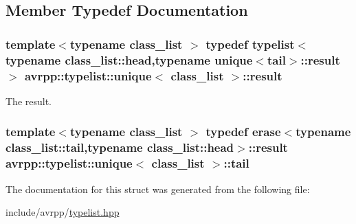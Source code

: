 \subsection{Member Typedef Documentation}
\hypertarget{structavrpp_1_1typelist_1_1unique_a97c55b4f6702dc3b0997cf84b767fcb5}{
\subsubsection[{result}]{\setlength{\rightskip}{0pt plus 5cm}template$<$typename class\_\-list $>$ typedef {\bf typelist}$<$typename class\_\-list::head,typename {\bf unique}$<${\bf tail}$>$::{\bf result}$>$ {\bf avrpp::typelist::unique}$<$ class\_\-list $>$::{\bf result}}}
\label{structavrpp_1_1typelist_1_1unique_a97c55b4f6702dc3b0997cf84b767fcb5}


The result. 

\hypertarget{structavrpp_1_1typelist_1_1unique_a4868ed50111f93853eed0321df7395ec}{
\subsubsection[{tail}]{\setlength{\rightskip}{0pt plus 5cm}template$<$typename class\_\-list $>$ typedef {\bf erase}$<$typename class\_\-list::tail,typename class\_\-list::head$>$::{\bf result} {\bf avrpp::typelist::unique}$<$ class\_\-list $>$::{\bf tail}}}
\label{structavrpp_1_1typelist_1_1unique_a4868ed50111f93853eed0321df7395ec}


The documentation for this struct was generated from the following file:\begin{DoxyCompactItemize}
\item 
include/avrpp/\hyperlink{typelist_8hpp}{typelist.hpp}\end{DoxyCompactItemize}
